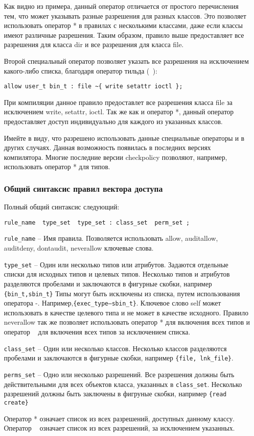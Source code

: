 \documentclass{./../class/UIR}
\begin{document}
    Как видно из примера, данный оператор отличается от простого перечисления
    тем, что может указывать разные разрешения для разных классов. Это позволяет
    использовать оператор  * в правилах с несколькими классами, даже если классы
    имеют различные разрешения. Таким образом, правило выше предоставляет все
    разрешения для класса dir и все разрешения для класса file.

    Второй специальный оператор позволяет указать все разрешения на исключением
    какого-либо списка, благодаря оператор тильда (~):
\begin{verbatim}
allow user_t bin_t : file ~{ write setattr ioctl };
\end{verbatim}
    При компиляции данное правило предоставлет все разрешения класса file за
    исключением write, setattr, ioctl. Так же как и оператор *, данный оператор
    предоставляет доступ индивидуально для каждого из указанных классов.

    Имейте в виду, что разрешено использовать данные специальные операторы и в
    других случаях. Данная возможность появилась в последних версиях
    компилятора. Многие последние версии checkpolicy позволяют, например,
    использовать оператор * для типов.

\subsubsection{Общий синтаксис правил вектора доступа}
    Полный общий синтаксис следующий:
\begin{verbatim}
rule_name  type_set  type_set : class_set  perm_set ;
\end{verbatim}
    \begin{description}
    \item \verb"rule_name" – Имя правила. Позволяется использовать allow,
    auditallow, auditdeny, dontaudit, neverallow ключевые слова.
    \item \verb"type_set" – Один или несколько типов или атрибутов. Задаются
    отдельные списки для исходных типов и целевых типов. Несколько типов и
    атрибутов разделяются пробелами и заключаются в фигурные скобки, например
    \verb"{bin_t,sbin_t}" Типы могут быть исключены из списка, путем
    использования оператора -. Например,\verb"{exec_type–sbin_t}".
    Ключевое слово self может использовать в качестве целевого типа и не может
    в качестве исходного. Правило neverallow так же позволяет использовать
    оператор * для включения всех типов и оператор ~ для включения всех типов
    за исключением списка.
    \item \verb"class_set" – Один или несколько классов. Несколько классов
    разделяются пробелами и заключаются в фигурные скобки, например
    \verb"{file, lnk_file}".
    \item \verb"perms_set" – Одно или несколько разрешений. Все разрешения
    должны быть действительными для всех объектов класса, указанных в
    \verb"class_set". Несколько разрешений должны быть заключены в фигруные
    скобки, например \verb"{read create}"
    \end{description}
    Оператор * означает список из всех разрешений, доступных данному классу.
    Оператор ~ означает список из всех разрешений, за исключением указанных.
\end{document}
